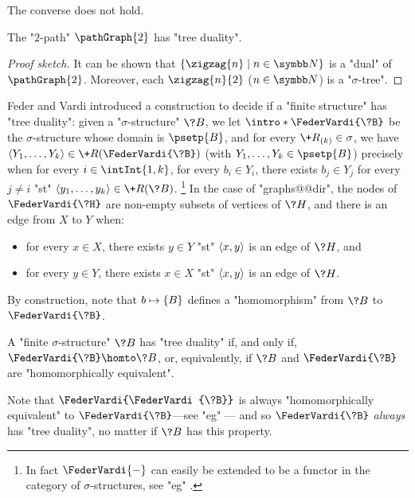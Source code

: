 The converse does not hold.
\begin{proposition}
	\AP\label{prop:2-path-tree-duality}
	The "$2$-path" $\pathGraph{2}$ has "tree duality".
\end{proposition}

\begin{proof}[Proof sketch]
	It can be shown that $\{\zigzag{n} \mid n\in\N\}$ is a "dual" of
	$\pathGraph{2}$. Moreover, each $\zigzag{n}{2}$ ($n\in\N$) is a "$\sigma$-tree".
\end{proof}

Feder and Vardi introduced a construction to decide if a "finite structure" has "tree duality":
given a "$\sigma$-structure" $\?B$, we let \AP$\intro*\FederVardi{\?B}$ be
the $\sigma$-structure whose domain is $\psetp{B}$, and for every $\+R_{(k)} \in \sigma$,
we have $\tup{Y_1, \dotsc, Y_k} \in \+R(\FederVardi{\?B})$ 
(with $Y_1, \dotsc, Y_k \in \psetp{B}$) precisely when 
for every $i\in \intInt{1,k}$, 
for every $b_i \in Y_i$,
there exists $b_j \in Y_j$ for every $j \neq i$ "st" 
$\tup{y_1, \dotsc, y_k} \in \+R(\?B)$.%
\footnote{In fact $\FederVardi{-}$ can
easily be extended to be a functor in the category of $\sigma$-structures, see
"eg" \cite[\S~9.2.2]{NesetrilPOM2012FirstOrderCSPs}.}
In the case of "graphs@@dir", the nodes of $\FederVardi{\?H}$ are non-empty
subsets of vertices of $\?H$, and there is an edge from $X$ to $Y$ when:
\begin{itemize}
	\item for every $x \in X$, there exists $y\in Y$ "st" $\langle x,y\rangle$ is an edge of $\?H$, and
	\item for every $y\in Y$, there exists $x\in X$ "st" $\langle x,y\rangle$ is an edge of $\?H$.
\end{itemize}

By construction, note that $b \mapsto \{B\}$ defines a "homomorphism" from
$\?B$ to $\FederVardi{\?B}$.

\begin{proposition}
	\label{prop:charac-Feder-Vardi}
	A "finite $\sigma$-structure" $\?B$ has "tree duality" if, and only if,
	$\FederVardi{\?B} \homto \?B$, or, equivalently, if $\?B$ and $\FederVardi{\?B}$
	are "homomorphically equivalent".
\end{proposition}

Note that $\FederVardi{\FederVardi{\?B}}$ is always "homomorphically equivalent" to
$\FederVardi{\?B}$---see "eg" \cite[\S~9.2.2, Proposition 9.1]{NesetrilPOM2012FirstOrderCSPs}---
and so $\FederVardi{\?B}$ \emph{always} has "tree duality", no matter if $\?B$ has this property.

